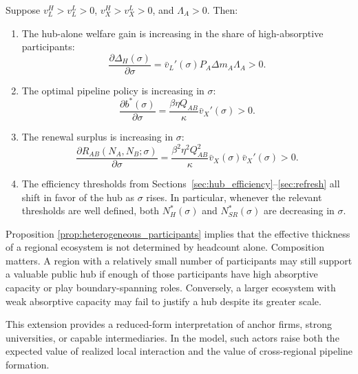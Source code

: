 \begin{proposition}
\label{prop:heterogeneous_participants}
Suppose $v_L^H>v_L^L>0$, $v_X^H>v_X^L>0$, and $\Lambda_A>0$. Then:

\begin{enumerate}[leftmargin=2em]
    \item The hub-alone welfare gain is increasing in the share of high-absorptive participants:
    \begin{equation}
    \frac{\partial \Delta_H(\sigma)}{\partial \sigma}
    =
    \bar v_L'(\sigma)P_A\Delta m_A\Lambda_A
    >0.
    \label{eq:dDeltaH_dsigma}
    \end{equation}

    \item The optimal pipeline policy is increasing in $\sigma$:
    \begin{equation}
    \frac{\partial b^*(\sigma)}{\partial \sigma}
    =
    \frac{\beta\eta Q_{AB}}{\kappa}\bar v_X'(\sigma)
    >0.
    \label{eq:dbstar_dsigma}
    \end{equation}

    \item The renewal surplus is increasing in $\sigma$:
    \begin{equation}
    \frac{\partial R_{AB}(N_A,N_B;\sigma)}{\partial \sigma}
    =
    \frac{\beta^2\eta^2Q_{AB}^2}{\kappa}
    \bar v_X(\sigma)\bar v_X'(\sigma)
    >0.
    \label{eq:dR_dsigma}
    \end{equation}

    \item The efficiency thresholds from Sections~\ref{sec:hub_efficiency}--\ref{sec:refresh} all shift in favor of the hub as $\sigma$ rises. In particular, whenever the relevant thresholds are well defined, both $N_H^*(\sigma)$ and $N_{SR}^*(\sigma)$ are decreasing in $\sigma$.
\end{enumerate}
\end{proposition}

Proposition \ref{prop:heterogeneous_participants} implies that the effective thickness of a regional ecosystem is not determined by headcount alone. Composition matters. A region with a relatively small number of participants may still support a valuable public hub if enough of those participants have high absorptive capacity or play boundary-spanning roles. Conversely, a larger ecosystem with weak absorptive capacity may fail to justify a hub despite its greater scale.

This extension provides a reduced-form interpretation of anchor firms, strong universities, or capable intermediaries. In the model, such actors raise both the expected value of realized local interaction and the value of cross-regional pipeline formation.

